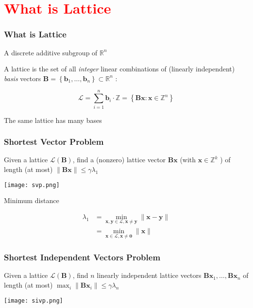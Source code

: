 \documentclass{beamer}
\begin{document}
\section{\textcolor{red}{What is Lattice}}


\begin{frame}
	\frametitle{What is Lattice}
	\begin{definition}[Lattice]
		A discrete additive subgroup of $\mathbb{R}^n$
	\end{definition}
	A lattice is the set of all \emph{integer} linear combinations of (linearly independent) \emph{basis} vectors $\mathbf{B}=\left\{\mathbf{b}_1, \ldots, \mathbf{b}_n\right\} \subset \mathbb{R}^n$ :

$$
\mathcal{L}=\sum_{i=1}^n \mathbf{b}_i \cdot \mathbb{Z}=\left\{\mathbf{B} \mathbf{x}: \mathbf{x} \in \mathbb{Z}^n\right\}
$$

The same lattice has many bases

\end{frame}


\begin{frame}
	\frametitle{Shortest Vector Problem}
	\begin{definition}
		Given a lattice $\mathcal{L}(\mathbf{B})$, find a (nonzero) lattice vector $\mathbf{B x}$ (with $\mathbf{x} \in \mathbb{Z}^k$ ) of length (at most) $\|\mathbf{B} \mathbf{x}\| \leq \gamma \lambda_1$
	\end{definition}
	\texttt{[image: svp.png]}
	
	Minimum distance

$$
\begin{aligned}
\lambda_1 & =\min _{\mathbf{x}, \mathbf{y} \in \mathcal{L}, \mathbf{x} \neq \mathbf{y}}\|\mathbf{x}-\mathbf{y}\| \\
& =\min _{\mathbf{x} \in \mathcal{L}, \mathbf{x} \neq \mathbf{0}}\|\mathbf{x}\|
\end{aligned}
$$


\end{frame}

\begin{frame}
	\frametitle{Shortest Independent Vectors Problem}
	\begin{definition}
		Given a lattice $\mathcal{L}(\mathbf{B})$, find $n$ linearly independent lattice vectors $\mathbf{B x}_1, \ldots, \mathbf{B} \mathbf{x}_n$ of length (at most) $\max _i\left\|\mathbf{B} \mathbf{x}_i\right\| \leq \gamma \lambda_n$
	\end{definition}
	\texttt{[image: sivp.png]}

\end{frame}
\end{document}

